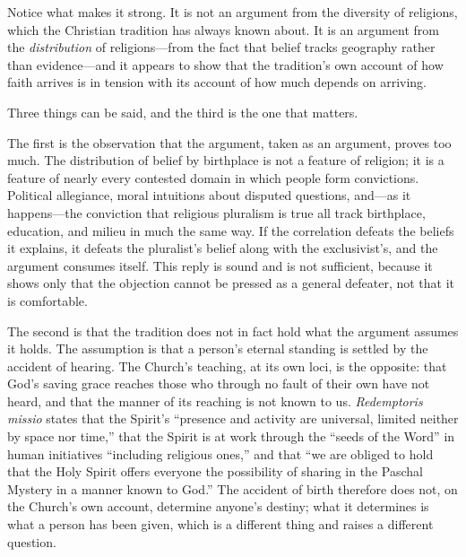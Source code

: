 Notice what makes it strong. It is not an argument from the diversity of religions, which the Christian tradition has always known about. It is an argument from the \emph{distribution} of religions---from the fact that belief tracks geography rather than evidence---and it appears to show that the tradition's own account of how faith arrives is in tension with its account of how much depends on arriving.

Three things can be said, and the third is the one that matters.

The first is the observation that the argument, taken as an argument, proves too much. The distribution of belief by birthplace is not a feature of religion; it is a feature of nearly every contested domain in which people form convictions. Political allegiance, moral intuitions about disputed questions, and---as it happens---the conviction that religious pluralism is true all track birthplace, education, and milieu in much the same way. If the correlation defeats the beliefs it explains, it defeats the pluralist's belief along with the exclusivist's, and the argument consumes itself. This reply is sound and is not sufficient, because it shows only that the objection cannot be pressed as a general defeater, not that it is comfortable.

The second is that the tradition does not in fact hold what the argument assumes it holds. The assumption is that a person's eternal standing is settled by the accident of hearing. The Church's teaching, at its own loci, is the opposite: that God's saving grace reaches those who through no fault of their own have not heard, and that the manner of its reaching is not known to us. \emph{Redemptoris missio} states that the Spirit's ``presence and activity are universal, limited neither by space nor time,'' that the Spirit is at work through the ``seeds of the Word'' in human initiatives ``including religious ones,'' and that ``we are obliged to hold that the Holy Spirit offers everyone the possibility of sharing in the Paschal Mystery in a manner known to God.'' The accident of birth therefore does not, on the Church's own account, determine anyone's destiny; what it determines is what a person has been given, which is a different thing and raises a different question.

